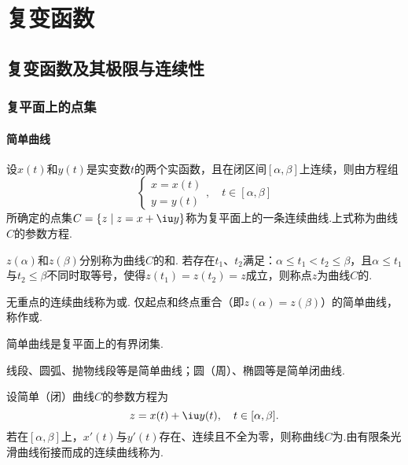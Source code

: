 \chapter{复变函数}
\section{复变函数及其极限与连续性}
\subsection{复平面上的点集}
\subsubsection{简单曲线}
\begin{definition}
设\(x(t)\)和\(y(t)\)是实变数\(t\)的两个实函数，且在闭区间\([\alpha,\beta]\)上连续，则由方程组\[
\left\{ \begin{array}{l}
x = x(t) \\
y = y(t)
\end{array} \right., \quad t \in [\alpha,\beta]
\]所确定的点集\(C = \{ z \mid z = x + \iu y \}\)称为复平面上的一条连续曲线.上式称为曲线\(C\)的参数方程.

\(z(\alpha)\)和\(z(\beta)\)分别称为曲线\(C\)的和.
若存在\(t_1\)、\(t_2\)满足：\(\alpha \leq t_1 < t_2 \leq \beta\)，且\(\alpha \leq t_1\)与\(t_2 \leq \beta\)不同时取等号，使得\(z(t_1) = z(t_2) = z\)成立，则称点\(z\)为曲线\(C\)的.

无重点的连续曲线称为或.
仅起点和终点重合（即\(z(\alpha)=z(\beta)\)）的简单曲线，称作或.
\end{definition}

\begin{property}
简单曲线是复平面上的有界闭集.
\end{property}

\begin{example}
线段、圆弧、抛物线段等是简单曲线；圆（周）、椭圆等是简单闭曲线.
\end{example}

\begin{definition}
设简单（闭）曲线\(C\)的参数方程为\[
z = x(t) + \iu y(t), \quad t \in [\alpha,\beta].
\]若在\([\alpha,\beta]\)上，\(x'(t)\)与\(y'(t)\)存在、连续且不全为零，则称曲线\(C\)为.由有限条光滑曲线衔接而成的连续曲线称为.
\end{definition}

